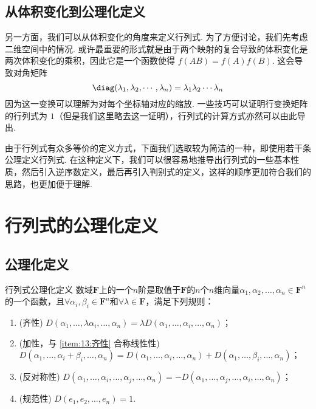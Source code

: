 \subsection{从体积变化到公理化定义}

另一方面，我们可以从体积变化的角度来定义行列式. 为了方便讨论，我们先考虑二维空间中的情况. 或许最重要的形式就是由于两个映射的复合导致的体积变化是两次体积变化的乘积，因此它是一个函数使得 $f(AB) = f(A)f(B)$. 这会导致对角矩阵
\[\diag(\lambda_1, \lambda_2, \cdots, \lambda_n) = \lambda_1\lambda_2\cdots\lambda_n\]
因为这一变换可以理解为对每个坐标轴对应的缩放. 一些技巧可以证明行变换矩阵的行列式为 $1$（但是我们这里略去这一证明），行列式的计算方式亦然可以由此导出.

由于行列式有众多等价的定义方式，下面我们选取较为简洁的一种，即使用若干条公理定义行列式. 在这种定义下，我们可以很容易地推导出行列式的一些基本性质，然后引入逆序数定义，最后再引入判别式的定义，这样的顺序更加符合我们的思路，也更加便于理解.


\section{行列式的公理化定义}

\subsection{公理化定义}

\begin{definition}{行列式}{公理化定义}
    数域$\mathbf{F}$上的一个$n$阶是取值于$\mathbf{F}$的$n$个$n$维向量$\alpha_1,\alpha_2,\ldots,\alpha_n \in \mathbf{F}^n$的一个函数，且$\forall \alpha_i,\beta_i \in \mathbf{F}^n$和$\forall \lambda \in \mathbf{F}$，满足下列规则：
    \begin{enumerate}
        \item \label{item:13:齐性}
              (齐性) $D(\alpha_1,\ldots,\lambda\alpha_i,\ldots,\alpha_n)=\lambda D(\alpha_1,\ldots,\alpha_i,\ldots,\alpha_n)$；

        \item \label{item:13:加性}
              (加性，与 \ref*{item:13:齐性} 合称线性性) \\
              $D(\alpha_1,\ldots,\alpha_i+\beta_i,\ldots,\alpha_n)=D(\alpha_1,\ldots,\alpha_i,\ldots,\alpha_n)+D(\alpha_1,\ldots,\beta_i,\ldots,\alpha_n)$；

        \item \label{item:13:反对称性}
              (反对称性) $D(\alpha_1,\ldots,\alpha_i,\ldots,\alpha_j,\ldots,\alpha_n)=-D(\alpha_1,\ldots,\alpha_j,\ldots,\alpha_i,\ldots,\alpha_n)$；

        \item \label{item:13:规范性}
              (规范性) $D(e_1,e_2,\ldots,e_n)=1$.
    \end{enumerate}
\end{definition}

